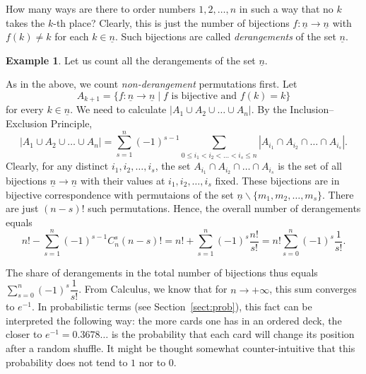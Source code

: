 \documentclass[12pt,notitlepage]{article}
\theoremstyle{plain}
\theoremstyle{definition}
\newtheorem{exm}[thm]{Example}
\theoremstyle{plain}
\renewcommand{\setminus}{\smallsetminus}
\newcommand{\ul}[1]{\underline{#1}}
\newcommand{\1}{\mathbf{1}}
\newcommand{\0}{\mathbf{0}}
\begin{document}
How many ways are there to order numbers $1, 2, \ldots, n$ in such a way that no $k$ takes the $k$-th place? Clearly, this is just the number of bijections $f\colon\ul{n} \to \ul{n}$ with $f(k) \neq k$ for each $k \in \ul{n}$. Such bijections are called \emph{derangements} of the set $\ul{n}$.
\begin{exm}
Let us count all the derangements of the set $\ul{n}$.

As in the above, we count \emph{non-derangement} permutations first. Let
$$A_{k + 1} = \{f\colon \ul{n} \to \ul{n} \mid f\mbox{ is bijective and } f(k) = k\}$$
for every $k \in \ul{n}$. We need to calculate $|A_1 \cup A_2 \cup\ldots\cup A_n|$. By the Inclusion--Exclusion Principle,
$$|A_1 \cup A_2 \cup \ldots \cup A_n| = \sum\limits_{s = 1}^{n} (-1)^{s - 1} \sum\limits_{0 \leqslant i_1 < i_2 < \ldots < i_s  \leq n} |A_{i_1} \cap A_{i_2} \cap \ldots \cap A_{i_s}|.$$
Clearly, for any distinct $i_1, i_2, \ldots, i_s$, the set $A_{i_1} \cap A_{i_2} \cap \ldots \cap A_{i_s}$ is the set of all bijections $\ul{n} \to \ul{n}$ with their values at $i_1, i_2,\ldots, i_s$ fixed. These bijections are in bijective correspondence with permutaions of the set $\ul{n}\setminus \{m_1,m_2,\ldots,m_s\}$. There are just $(n-s)!$ such permutations. Hence, the overall number of derangements equals
$$n! - \sum\limits_{s = 1}^{n} (-1)^{s - 1} C_{n}^s (n-s)! = n! + \sum\limits_{s = 1}^{n} (-1)^{s} \dfrac{n!}{s!} = n!\sum\limits_{s = 0}^{n} (-1)^{s} \dfrac{1}{s!}.$$
\end{exm}
The share of derangements in the total number of bijections thus equals $\sum\limits_{s = 0}^{n} (-1)^{s} \dfrac{1}{s!}$. From Calculus, we know that for $n \to +\infty$, this sum converges to $e^{-1}$. In probabilistic terms (see Section~\ref{sect:prob}), this fact can be interpreted the following way: the more cards one has in an ordered deck, the closer to $e^{-1} = 0.3678\ldots$ is the probability that each card will change its position after a random shuffle. It might be thought somewhat counter-intuitive that this probability does not tend to $1$ nor to $0$.
\end{document}
